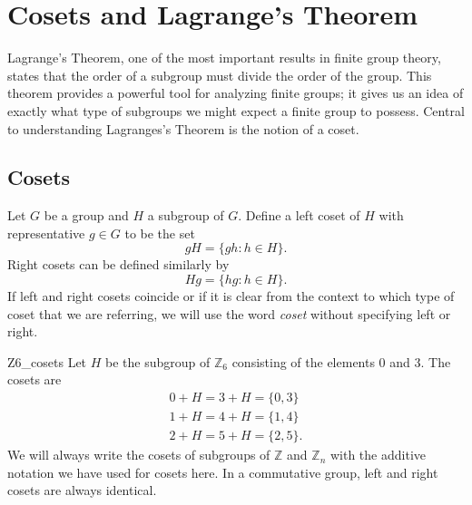 \chapter{Cosets and Lagrange's Theorem}\label{cosets}


Lagrange's Theorem, one of the most important results in finite group theory, states that the order of a subgroup must divide the order of the group.  This theorem provides a powerful tool for analyzing finite groups; it gives us an idea of exactly what type of subgroups we might expect a finite group to possess.  Central to understanding Lagranges's Theorem is the notion of a coset.


\section{Cosets}

Let $G$ be a group and $H$ a subgroup of $G$.  Define a {\bfi left  coset\/} of $H$ with {\bfi  representative} $g \in G$ to be the set 
\[
gH = \{ gh : h \in H \}.
\]
{\bfi Right cosets\/} can be defined similarly by
\[
Hg = \{ hg : h \in H \}.
\]
If left and right cosets coincide or if it is clear from the context to which type of coset that we are referring, we will use the word {\em coset\/} without specifying left or right. 

\begin{example}{Z6_cosets}
Let $H$ be the subgroup of ${\mathbb Z}_6$ consisting of the elements 0 and 3.  The cosets are 
\begin{gather*}
0 + H = 3 + H = \{ 0, 3 \} \\
1 + H = 4 + H = \{ 1, 4 \} \\
2 + H = 5 + H = \{ 2, 5 \}.
\end{gather*}
We will always write the cosets of subgroups of ${\mathbb Z}$ and ${\mathbb Z}_n$ with the additive notation we have used for cosets here.  In a commutative group, left and right cosets are always identical. 
\end{example}

